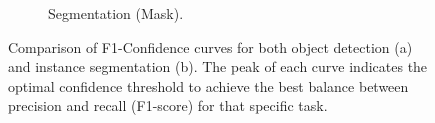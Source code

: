 \begin{figure}[h!]
\begin{subfigure}[b]{0.49\textwidth}
        \caption{Segmentation (Mask).}
        \label{fig:mask_f1_appendix}
    \end{subfigure}
    \caption[F1-Confidence Curves for Detection and Segmentation.] 
    {Comparison of F1-Confidence curves for both object detection (a) and instance segmentation (b). The peak of each curve indicates the optimal confidence threshold to achieve the best balance between precision and recall (F1-score) for that specific task.} 
    \label{fig:f1_curves_appendix}
\end{figure}